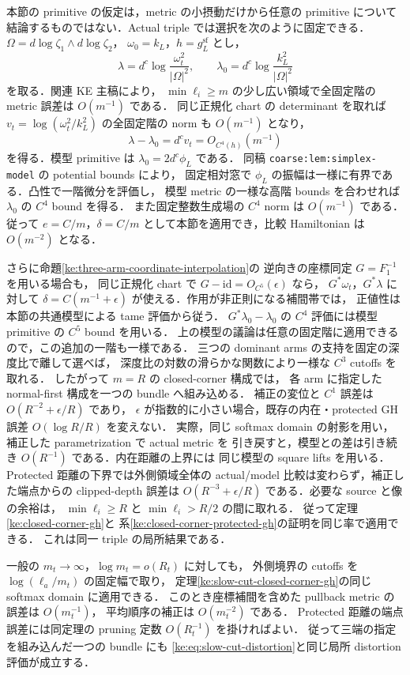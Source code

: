 本節の primitive の仮定は，metric の小摂動だけから任意の primitive について
結論するものではない．Actual triple では選択を次のように固定できる．
$\Omega=d\log\zeta_1\wedge d\log\zeta_2$，
$\omega_0=k_L$，$h=g_L^{\mathrm{sf}}$ とし，
\[
 \lambda=d^c\log\frac{\omega_t^2}{|\Omega|^2},\qquad
 \lambda_0=d^c\log\frac{k_L^2}{|\Omega|^2}
\]
を取る．関連 KE 主稿\cite[\texttt{coarse:thm:full-triple-tensor}]{KELocalCurrent}により，
$\min\ell_i\ge m$ の少し広い領域で全固定階の metric 誤差は $O(m^{-1})$ である．
同じ正規化 chart の determinant を取れば
$v_t=\log(\omega_t^2/k_L^2)$ の全固定階の norm も $O(m^{-1})$ となり，
\[
 \lambda-\lambda_0=d^cv_t=O_{C^4(h)}(m^{-1})
\]
を得る．模型 primitive は $\lambda_0=2d^c\phi_L$ である．
同稿 \texttt{coarse:lem:simplex-model} の potential bounds により，
固定相対窓で $\phi_L$ の振幅は一様に有界である．凸性で一階微分を評価し，
模型 metric の一様な高階 bounds を合わせれば $\lambda_0$ の $C^4$ bound を得る．
また固定整数生成場の $C^4$ norm は $O(m^{-1})$ である．
従って $e=C/m$，$\delta=C/m$ として本節を適用でき，比較 Hamiltonian は
$O(m^{-2})$ となる．

さらに命題\ref{ke:three-arm-coordinate-interpolation}の
逆向きの座標同定 $G=F_1^{-1}$ を用いる場合も，
同じ正規化 chart で $G-\mathrm{id}=O_{C^5}(\epsilon)$ なら，
$G^*\omega_t$，$G^*\lambda$ に対して
$\delta=C(m^{-1}+\epsilon)$ が使える．作用が非正則になる補間帯では，
正値性は本節の共通模型による tame 評価から従う．
$G^*\lambda_0-\lambda_0$ の $C^4$ 評価には模型 primitive の $C^5$ bound を用いる．
上の模型の議論は任意の固定階に適用できるので，この追加の一階も一様である．
三つの dominant arms の支持を固定の深度比で離して選べば，
深度比の対数の滑らかな関数により一様な $C^3$ cutoffs を取れる．
したがって $m=R$ の closed-corner 構成では，
各 arm に指定した normal-first 構成を一つの bundle へ組み込める．
補正の変位と $C^1$ 誤差は $O(R^{-2}+\epsilon/R)$ であり，
$\epsilon$ が指数的に小さい場合，既存の内在・protected GH 誤差
$O(\log R/R)$ を変えない．
実際，同じ softmax domain の射影を用い，補正した parametrization で actual metric を
引き戻すと，模型との差は引き続き $O(R^{-1})$ である．内在距離の上界には
同じ模型の square lifts を用いる．Protected 距離の下界では外側領域全体の actual/model
比較は変わらず，補正した端点からの clipped-depth 誤差は
$O(R^{-3}+\epsilon/R)$ である．必要な source と像の余裕は，
$\min\ell_i\ge R$ と $\min\ell_i>R/2$ の間に取れる．
従って定理\ref{ke:closed-corner-gh}と
系\ref{ke:closed-corner-protected-gh}の証明を同じ率で適用できる．
これは同一 triple の局所結果である．

一般の $m_t\to\infty$，$\log m_t=o(R_t)$ に対しても，
外側境界の cutoffs を $\log(\ell_a/m_t)$ の固定幅で取り，
定理\ref{ke:slow-cut-closed-corner-gh}の同じ softmax domain に適用できる．
このとき座標補間を含めた pullback metric の誤差は $O(m_t^{-1})$，
平均順序の補正は $O(m_t^{-2})$ である．
Protected 距離の端点誤差には同定理の pruning 定数 $O(R_t^{-1})$ を掛ければよい．
従って三端の指定を組み込んだ一つの bundle にも
\eqref{ke:eq:slow-cut-distortion}と同じ局所 distortion 評価が成立する．

